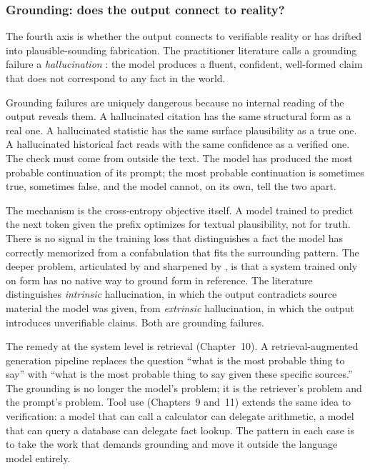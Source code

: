 \subsubsection{Grounding: does the output connect to reality?}

The fourth axis is whether the output connects to verifiable
reality or has drifted into plausible-sounding fabrication. The
practitioner literature calls a grounding failure a
\emph{hallucination} \citep{ji2023survey}: the model produces a
fluent, confident, well-formed claim that does not correspond to
any fact in the world.

Grounding failures are uniquely dangerous because no internal
reading of the output reveals them. A hallucinated citation has
the same structural form as a real one. A hallucinated statistic
has the same surface plausibility as a true one. A hallucinated
historical fact reads with the same confidence as a verified one.
The check must come from outside the text. The model has produced
the most probable continuation of its prompt; the most probable
continuation is sometimes true, sometimes false, and the model
cannot, on its own, tell the two apart.

The mechanism is the cross-entropy objective itself. A model
trained to predict the next token given the prefix optimizes for
textual plausibility, not for truth. There is no signal in the
training loss that distinguishes a fact the model has correctly
memorized from a confabulation that fits the surrounding pattern.
The deeper problem, articulated by \citet{harnad1990symbol} and
sharpened by \citet{bender2020climbing}, is that a system trained
only on form has no native way to ground form in reference. The
literature distinguishes \emph{intrinsic} hallucination, in which
the output contradicts source material the model was given, from
\emph{extrinsic} hallucination, in which the output introduces
unverifiable claims. Both are grounding failures.

The remedy at the system level is retrieval (Chapter~10). A
retrieval-augmented generation pipeline replaces the question
``what is the most probable thing to say'' with ``what is the most
probable thing to say given these specific sources.'' The grounding
is no longer the model's problem; it is the retriever's problem
and the prompt's problem. Tool use (Chapters~9 and~11) extends the
same idea to verification: a model that can call a calculator can
delegate arithmetic, a model that can query a database can
delegate fact lookup. The pattern in each case is to take the work
that demands grounding and move it outside the language model
entirely.

